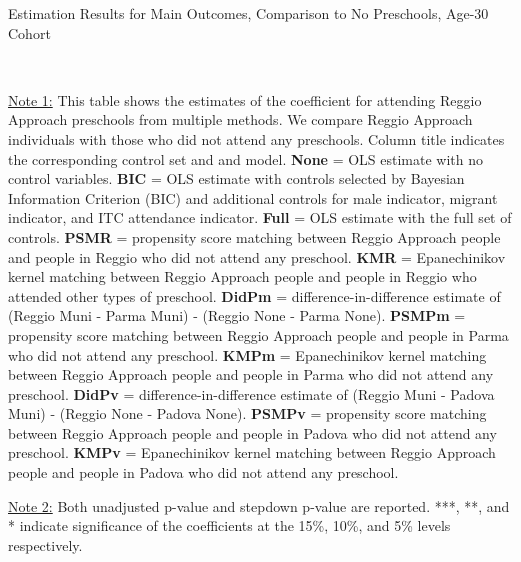 \begin{table}[H] \caption{Estimation Results for Main Outcomes, Comparison to No Preschools, Age-30 Cohort} \label{ols-M-adult30-reg-nopres}
\scalebox{0.6}{}
\vspace{1ex} \\
\footnotesize\raggedright{\underline{Note 1:} This table shows the estimates of the coefficient for attending Reggio Approach preschools from multiple methods. We compare Reggio Approach individuals with those who did not attend any preschools. Column title indicates the corresponding control set and and model. \textbf{None} = OLS estimate with no control variables. \textbf{BIC} = OLS estimate with controls selected by Bayesian Information Criterion (BIC) and additional controls for male indicator, migrant indicator, and ITC attendance indicator. \textbf{Full} = OLS estimate with the full set of controls. \textbf{PSMR} =  propensity score matching between Reggio Approach people and people in Reggio who did not attend any preschool. \textbf{KMR} = Epanechinikov kernel matching between Reggio Approach people and people in Reggio who attended other types of preschool. \textbf{DidPm} = difference-in-difference estimate of (Reggio Muni - Parma Muni) - (Reggio None - Parma None). \textbf{PSMPm} = propensity score matching between Reggio Approach people and people in Parma who did not attend any preschool. \textbf{KMPm} = Epanechinikov kernel matching between Reggio Approach people and people in Parma who did not attend any preschool. \textbf{DidPv} = difference-in-difference estimate of (Reggio Muni - Padova Muni) - (Reggio None - Padova None). \textbf{PSMPv} = propensity score matching between Reggio Approach people and people in Padova who did not attend any preschool. \textbf{KMPv} = Epanechinikov kernel matching between Reggio Approach people and people in Padova who did not attend any preschool.} 

\footnotesize\raggedright{\underline{Note 2:} Both unadjusted p-value and stepdown p-value are reported. ***, **, and * indicate significance of the coefficients at the 15\%, 10\%, and 5\% levels respectively.}
\end{table}


